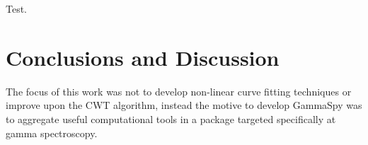 \documentclass[10pt]{article}
\begin{document}
Test. 

\pagebreak
\section{Conclusions and Discussion}

The focus of this work was not to develop non-linear curve fitting techniques or improve upon the CWT algorithm,
instead the motive to develop GammaSpy was to aggregate useful computational tools in a package
targeted specifically at gamma spectroscopy.

\pagebreak






\end{document}
